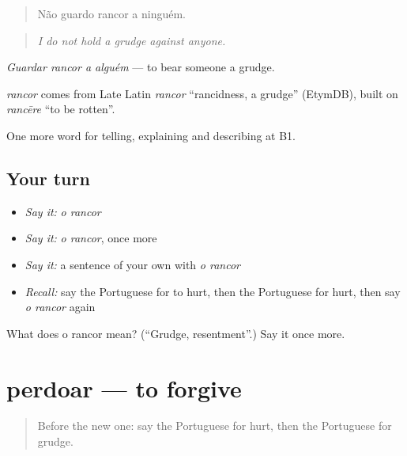 \begin{quote}
Não guardo rancor a ninguém.
\end{quote}

\begin{quote}
\emph{I do not hold a grudge against anyone.}
\end{quote}

\emph{Guardar rancor a alguém} — to bear someone a grudge.

\begin{cousinweb}
\emph{rancor} comes from Late Latin \emph{rancor} \textquotedblleft{}rancidness, a grudge\textquotedblright{} (EtymDB), built on \emph{rancēre} \textquotedblleft{}to be rotten\textquotedblright{}.
\end{cousinweb}

\begin{grammarlens}[title={What you've built}]
One more word for telling, explaining and describing at B1.
\end{grammarlens}

\subsection*{Your turn}
\begin{itemize}
\raggedright
  \item \emph{Say it:} \emph{o rancor}
  \item \emph{Say it:} \emph{o rancor}, once more
  \item \emph{Say it:} a sentence of your own with \emph{o rancor}
  \item \emph{Recall:} say the Portuguese for to hurt, then the Portuguese for hurt, then say \emph{o rancor} again
\end{itemize}

\begin{tcolorbox}[breakable,colback=teal!4,colframe=teal!35!black,title={Before you move on}]
What does o rancor mean? (\textquotedblleft{}Grudge, resentment\textquotedblright{}.) Say it once more.
\end{tcolorbox}
\section[perdoar]{perdoar — to forgive}

\label{lesson:PT-C479-perdoar}



\begin{quote}
Before the new one: say the Portuguese for hurt, then the Portuguese for grudge.
\end{quote}

